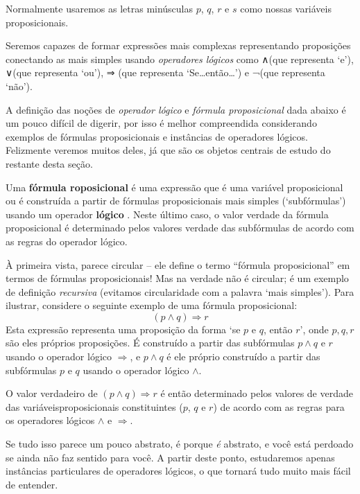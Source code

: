 Normalmente usaremos as letras minúsculas $p$, $q$, $r$ e $s$ como nossas variáveis ​​proposicionais.

Seremos capazes de formar expressões mais complexas representando proposições conectando as mais simples usando \textit{operadores lógicos} como ∧\wedge (que representa `e'), ∨\vee (que representa `ou'), ⇒ \Rightarrow (que representa `Se\dots{}então\dots{}') e ¬\neg (que representa `não').

A definição das noções de \textit{operador lógico} e \textit{fórmula proposicional} dada abaixo é um pouco difícil de digerir, por isso é melhor compreendida considerando exemplos de fórmulas proposicionais e instâncias de operadores lógicos. Felizmente veremos muitos deles, já que são os objetos centrais de estudo do restante desta seção.

\begin{definition}
\label{defPropositionalFormula}
\label{defLogicalOperator}
Uma \textbf{fórmula roposicional} é uma expressão que é uma variável proposicional ou é construída a partir de fórmulas proposicionais mais simples (`subfórmulas') usando um operador \textbf{\mbox{lógico} \mbox{}}. Neste último caso, o valor verdade da fórmula proposicional é determinado pelos valores verdade das subfórmulas de acordo com as regras do operador lógico.
\end{definition}

À primeira vista,  parece circular – ele define o termo “fórmula proposicional” em termos de fórmulas proposicionais! Mas na verdade não é circular; é um exemplo de definição \textit{recursiva} (evitamos circularidade com a palavra `mais simples'). Para ilustrar, considere o seguinte exemplo de uma fórmula proposicional:
\[
(p \wedge q) \Rightarrow r
\]
Esta expressão representa uma proposição da forma `se $p$ e $q$, então $r$', onde $p,q,r$ são eles próprios proposições. É construído a partir das subfórmulas $p \wedge q$ e $r$ usando o operador lógico $\Rightarrow$, e $p \wedge q$ é ele próprio construído a partir das subfórmulas $p$ e $q$ usando o operador lógico $\wedge$.

O valor verdadeiro de $(p \wedge q) \Rightarrow r$ é então determinado pelos valores de verdade das variáveis ​​proposicionais constituintes ($p$, $q$ e $r$) de acordo com as regras para os operadores lógicos $\wedge$ e $\Rightarrow$.

Se tudo isso parece um pouco abstrato, é porque \textit{é} abstrato, e você está perdoado se ainda não faz sentido para você. A partir deste ponto, estudaremos apenas instâncias particulares de operadores lógicos, o que tornará tudo muito mais fácil de entender.


